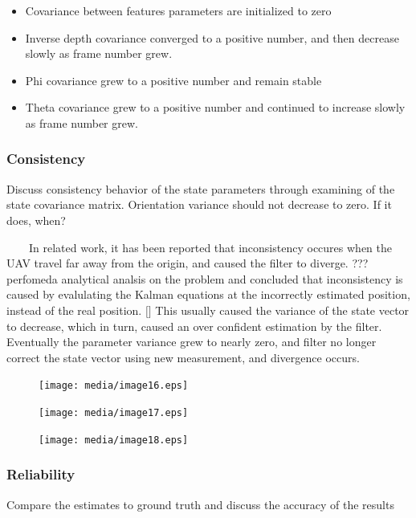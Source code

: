 \begin{itemize}
\item Covariance between features parameters are initialized to zero
\item Inverse depth covariance converged to a positive number, and then 
decrease slowly as frame number grew.
\item Phi covariance grew to a positive number and remain stable
\item Theta covariance grew to a positive number and continued to 
increase slowly as frame number grew. 
\end{itemize}
\newpage


\subsubsection{Consistency}
Discuss consistency behavior of the state parameters through examining 
of the state covariance matrix. Orientation variance should not decrease 
to zero. If it does, when?

\ \ \ \ In related work, it has been reported that inconsistency occures 
when the UAV travel far away from the origin, and caused the filter to 
diverge. ??? perfomeda analytical analsis on the problem and concluded 
that inconsistency is caused by evalulating the Kalman equations at the 
incorrectly estimated position, instead of the real position. $[$$]$ 
This usually caused the variance of the state vector to decrease, which 
in turn, caused an over confident estimation by the filter. Eventually 
the parameter variance grew to nearly zero, and filter no longer correct 
the state vector using new measurement, and divergence occurs. 

\begin{figure}[h]
\centering
\texttt{[image: media/image16.eps]}
\end{figure}




\begin{figure}[h]
\centering
\texttt{[image: media/image17.eps]}
\end{figure}


\begin{figure}[h]
\centering
\texttt{[image: media/image18.eps]}
\end{figure}




\newpage


\subsubsection{Reliability}
Compare the estimates to ground truth and discuss the accuracy of the 
results

